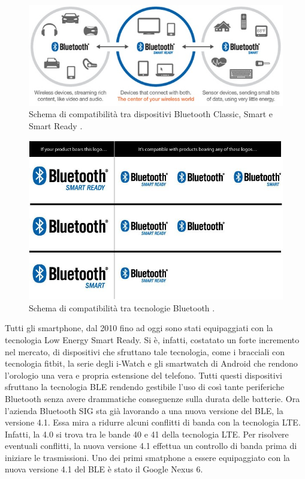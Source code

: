 \begin{figure}[t]
	\centering
	\includegraphics[width=0.9\linewidth, keepaspectratio]{Images/bt/bt_01}
	\caption[Schema di compatibilità.]{Schema di compatibilità tra dispositivi Bluetooth Classic, Smart e Smart Ready \cite{BT-Brand}.}
	\label{fig:bt_01}
\end{figure}

\begin{figure}[t]
	\centering
	\includegraphics[width=0.9\linewidth, keepaspectratio]{Images/bt/bt_02}
	\caption[Compatibilità tecnologie]{Schema di compatibilità tra tecnologie Bluetooth \cite{BT-2012-tabellacomparativa}.}
	\label{fig:bt_02}
\end{figure}

Tutti gli smartphone, dal 2010 fino ad oggi sono stati equipaggiati con la tecnologia Low Energy Smart Ready. Si è, infatti, costatato un forte incremento nel mercato, di dispositivi che sfruttano tale tecnologia, come i bracciali con tecnologia fitbit, la serie degli i-Watch e gli smartwatch di Android che rendono l'orologio una vera e propria estensione del telefono. Tutti questi dispositivi sfruttano la tecnologia \acs{BLE} rendendo gestibile l'uso di così tante periferiche Bluetooth senza avere drammatiche conseguenze sulla durata delle batterie. Ora l'azienda Bluetooth SIG sta già lavorando a una nuova versione del \acs{BLE}, la versione 4.1. Essa mira a ridurre alcuni conflitti di banda con la tecnologia \acf{LTE}. Infatti, la 4.0 si trova tra le bande 40 e 41 della tecnologia \acs{LTE}. Per risolvere eventuali conflitti, la nuova versione 4.1 effettua un controllo di banda prima di iniziare le trasmissioni. Uno dei primi smatphone a essere equipaggiato con la nuova versione 4.1 del \acs{BLE} è stato il Google Nexus 6.
\bigskip

